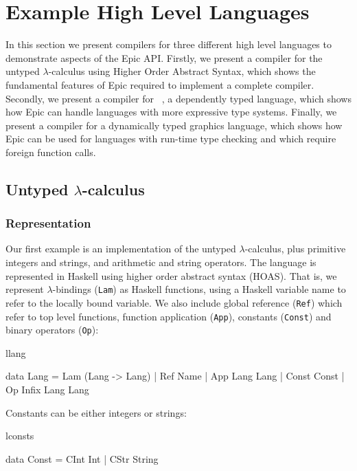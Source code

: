 \section{Example High Level Languages}

In this section we present compilers for three different high level
languages to demonstrate aspects of the Epic API. Firstly, we present
a compiler for the untyped $\lambda$-calculus using Higher Order
Abstract Syntax, which shows the fundamental features of Epic required
to implement a complete compiler. Secondly, we present a compiler for 
\LamPi{}~\cite{simply-easy}, a dependently typed language, which shows
how Epic can handle languages with more expressive type
systems. Finally, we present a compiler for a dynamically typed
graphics language, which shows how Epic can be used for languages with
run-time type checking and which require foreign function calls.

\subsection{Untyped $\lambda$-calculus}

\subsubsection{Representation}

Our first example is an implementation of the untyped
$\lambda$-calculus, plus primitive integers and strings, and
arithmetic and string operators. The language is represented in
Haskell using higher order abstract syntax (HOAS).  That is, we
represent $\lambda$-bindings (\texttt{Lam}) as Haskell functions,
using a Haskell variable name to refer to the locally bound
variable. We also include global reference (\texttt{Ref}) which refer
to top level functions, function application (\texttt{App}), constants
(\texttt{Const}) and binary operators (\texttt{Op}):

\begin{SaveVerbatim}{llang}

data Lang = Lam (Lang -> Lang)
          | Ref Name
          | App Lang Lang
          | Const Const
          | Op Infix Lang Lang

\end{SaveVerbatim}

\noindent
Constants can be either integers or strings:

\begin{SaveVerbatim}{lconsts}

data Const = CInt Int
           | CStr String

\end{SaveVerbatim}

